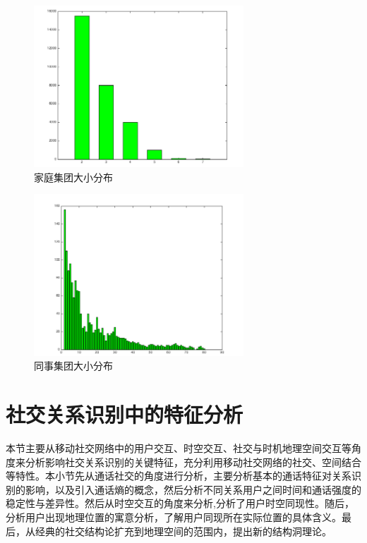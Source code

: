 \begin{figure}[ht]
    \centering
    \includegraphics[scale=1,width=0.7\textwidth]{figure/FamilyClique.png}
    \caption{家庭集团大小分布}
    \label{fig-familyclique}
\end{figure}

\begin{figure}[ht]
    \centering
    \includegraphics[scale=1,width=0.7\textwidth]{figure/ColleagueClique.png}
    \caption{同事集团大小分布}
    \label{fig-colleagueclique}
\end{figure}



\section{社交关系识别中的特征分析}

本节主要从移动社交网络中的用户交互、时空交互、社交与时机地理空间交互等角度来分析影响社交关系识别的关键特征，充分利用移动社交网络的社交、空间结合等特性。本小节先从通话社交的角度进行分析，主要分析基本的通话特征对关系识别的影响，以及引入通话熵的概念，然后分析不同关系用户之间时间和通话强度的稳定性与差异性。然后从时空交互的角度来分析,分析了用户时空同现性。随后，分析用户出现地理位置的寓意分析，了解用户同现所在实际位置的具体含义。最后，从经典的社交结构论扩充到地理空间的范围内，提出新的结构洞理论。

